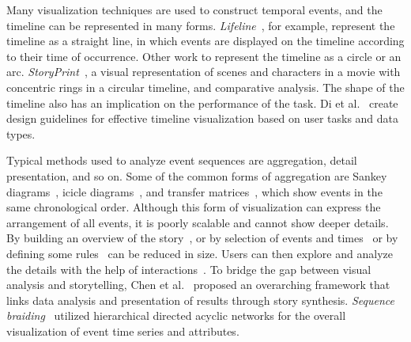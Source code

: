 \documentclass[review,journal]{vgtc}         %
\begin{document}
Many visualization techniques are used to construct temporal events, and the timeline can be represented in many forms. \textit{Lifeline}~\cite{plaisant_lifelines_2003}, for example, represent the timeline as a straight line, in which events are displayed on the timeline according to their time of occurrence. Other work to represent the timeline as a circle or an arc. \textit{StoryPrint}~\cite{watson_storyprint_2019}, a visual representation of scenes and characters in a movie with concentric rings in a circular timeline, and comparative analysis. The shape of the timeline also has an implication on the performance of the task.
Di et al.~\cite{di_bartolomeo_evaluating_2020} create design guidelines for effective timeline visualization based on user tasks and data types.

Typical methods used to analyze event sequences are aggregation, detail presentation, and so on. Some of the common forms of aggregation are Sankey diagrams~\cite{wongsuphasawat_exploring_2012, riehmann_interactive_2005}, icicle diagrams~\cite{monroe_temporal_2013, wongsuphasawat_lifeflow_2011}, and transfer matrices~\cite{yi_timematrix_2010, zhao_matrixwave_2015, bach_visualizing_2014}, which show events in the same chronological order. Although this form of visualization can express the arrangement of all events, it is poorly scalable and cannot show deeper details.
By building an overview of the story~\cite{perer_frequence_2014, liu_coreflow_2017}, or by selection of events and times~\cite{monroe_temporal_2013, baumgartl_search_2020, guo_visual_2018} or by defining some rules~\cite{zgraggen_s_2015, cappers_exploring_2017} can be reduced in size. Users can then explore and analyze the details with the help of interactions~\cite{magallanes_sequen-c_2021, pena-araya_hyperstorylines_2022}. To bridge the gap between visual analysis and storytelling, Chen et al.~\cite{chen_supporting_2018} proposed an overarching framework that links data analysis and presentation of results through story synthesis. \textit{Sequence braiding}~\cite{di_bartolomeo_s_2020} utilized hierarchical directed acyclic networks for the overall visualization of event time series and attributes.
\end{document}
